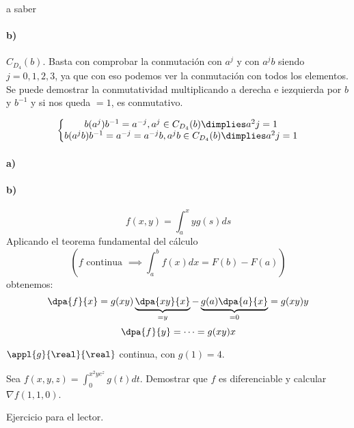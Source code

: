 \begin{problem}[5]
a saber
\solution

\paragraph{b)}
$C_{D_4}(b)$. Basta con comprobar la conmutación con $a^j$ y con $a^jb$ siendo $j = 0,1,2,3$, ya que con eso podemos ver la conmutación con todos los elementos. Se puede demostrar la conmutatividad multiplicando a derecha e iezquierda por $b$ y $b^{-1}$ y si nos queda $=1$, es conmutativo.

$$\left\{\begin{matrix}b(a^j)b^{-1} = a^{-j}, a^j \in C_{D_4}(b) \dimplies a^2j = 1\\
b(a^jb)b^{-1} = a^{-j} = a^{-j}b, a^jb \in C_{D_4}(b) \dimplies a^2j = 1\end{matrix}\right.$$
\end{problem}

\begin{problem}[9]
\solution
\paragraph{a)}
\paragraph{b)}

$$f(x,y) = \int_a^xy g(s)ds$$
Aplicando el teorema fundamental del cálculo \[\left(f \text{ continua } \implies\displaystyle\int_a^b f(x)dx = F(b)-F(a)\right)\] obtenemos:
$$\dpa{f}{x} = g(xy)\underbrace{\dpa{xy}{x}}_{=y} - \underbrace{g(a)\dpa{a}{x}}_{=0}  = g(xy)y$$
$$\dpa{f}{y} = \cdots  = g(xy)x$$
\end{problem}

\begin{problem}
$\appl{g}{\real}{\real}$ continua, con $g(1) = 4$.

Sea $f(x,y,z)=\displaystyle \int_0^{x^2ye^z} g(t)dt$.
Demostrar que $f$ es diferenciable y calcular $\nabla f(1,1,0)$.

\solution

Ejercicio para el lector.

\end{problem}
\newpage
